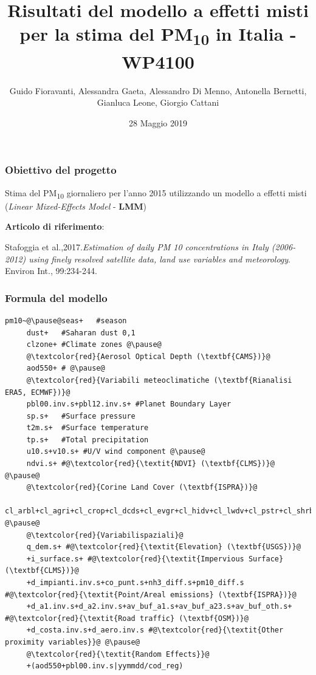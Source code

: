 \documentclass{beamer}
\title{Risultati del modello a effetti misti per la stima del PM\textsubscript{10} in Italia - \textbf{WP4100}}
\author{Guido Fioravanti, Alessandra Gaeta, Alessandro Di Menno, Antonella Bernetti, Gianluca Leone, Giorgio Cattani}
\date{28 Maggio 2019}
\institute{Istituto Superiore Per la Protezione e la Ricerca Ambientale}
\begin{document}

\maketitle

\begin{frame}

\frametitle{Obiettivo del progetto}
{\large Stima del PM\textsubscript{10} giornaliero per l'anno 2015 utilizzando un modello a effetti misti (\textit{Linear Mixed-Effects Model} - \textbf{LMM})\par}
\vspace{\baselineskip} %
\textbf{Articolo di riferimento}:\\
{\scriptsize Stafoggia et al.,2017.\textit{Estimation of daily PM 10 concentrations in Italy (2006-2012) using finely resolved satellite
data, land use variables and meteorology}.\\ Environ Int., 99:234-244.\par}

\end{frame}


\begin{frame}[fragile]
\frametitle{Formula del modello}

\begin{lstlisting}
pm10~@\pause@seas+   #season
     dust+   #Saharan dust 0,1
     clzone+ #Climate zones @\pause@
     @\textcolor{red}{Aerosol Optical Depth (\textbf{CAMS})}@	
     aod550+ # @\pause@
     @\textcolor{red}{Variabili meteoclimatiche (\textbf{Rianalisi ERA5, ECMWF})}@	
     pbl00.inv.s+pbl12.inv.s+ #Planet Boundary Layer
     sp.s+   #Surface pressure
     t2m.s+  #Surface temperature
     tp.s+   #Total precipitation
     u10.s+v10.s+ #U/V wind component @\pause@
     ndvi.s+ #@\textcolor{red}{\textit{NDVI} (\textbf{CLMS})}@ @\pause@
     @\textcolor{red}{Corine Land Cover (\textbf{ISPRA})}@
     cl_arbl+cl_agri+cl_crop+cl_dcds+cl_evgr+cl_hidv+cl_lwdv+cl_pstr+cl_shrb+ 	@\pause@
     @\textcolor{red}{Variabilispaziali}@
     q_dem.s+ #@\textcolor{red}{\textit{Elevation} (\textbf{USGS})}@
     +i_surface.s+ #@\textcolor{red}{\textit{Impervious Surface} (\textbf{CLMS})}@
     +d_impianti.inv.s+co_punt.s+nh3_diff.s+pm10_diff.s #@\textcolor{red}{\textit{Point/Areal emissions} (\textbf{ISPRA})}@
     +d_a1.inv.s+d_a2.inv.s+av_buf_a1.s+av_buf_a23.s+av_buf_oth.s+ #@\textcolor{red}{\textit{Road traffic} (\textbf{OSM})}@
     +d_costa.inv.s+d_aero.inv.s #@\textcolor{red}{\textit{Other proximity variables}}@ @\pause@
     @\textcolor{red}{\textit{Random Effects}}@ 
     +(aod550+pbl00.inv.s|yymmdd/cod_reg)
     	

\end{lstlisting}

\end{frame}
\end{document}
